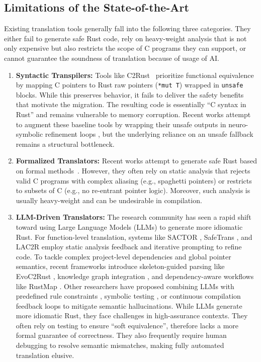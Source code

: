 \documentclass{llncs} %
\begin{document}
\subsection{Limitations of the State-of-the-Art}
%
Existing translation tools generally fall into the following three categories. They either fail to generate safe Rust code, rely on heavy-weight analysis that is not only expensive but also restricts the scope of C programs they can support, or cannot guarantee the soundness of translation because of usage of AI.
%
\begin{enumerate}
    \item \textbf{Syntactic Transpilers:} Tools like C2Rust~\cite{C2Rust} prioritize functional equivalence by mapping C pointers to Rust raw pointers (\texttt{*mut T}) wrapped in \texttt{unsafe} blocks. While this preserves behavior, it fails to deliver the safety benefits that motivate the migration. The resulting code is essentially ``C syntax in Rust'' and remains vulnerable to memory corruption. Recent works attempt to augment these baseline tools by wrapping their unsafe outputs in neuro-symbolic refinement loops \cite{nitin2025c2saferrust}, but the underlying reliance on an unsafe fallback remains a structural bottleneck.
    \item \textbf{Formalized Translators:} Recent works attempt to generate safe Rust based on formal methods~\cite{Emre2021,Fromherz2024}. However, they often rely on static analysis that rejects valid C programs with complex aliasing (e.g., spaghetti pointers) or restricts to subsets of C (e.g., no re-entrant pointer logic). Moreover, such analysis is usually heavy-weight and can be undesirable in compilation.
    \item \textbf{LLM-Driven Translators:} The research community has seen a rapid shift toward using Large Language Models (LLMs) to generate more idiomatic Rust. For function-level translation, systems like SACTOR \cite{zhou2025sactor}, SafeTrans \cite{farrukh2025safetrans}, and LAC2R \cite{sim2025lac2r} employ static analysis feedback and iterative prompting to refine code. To tackle complex project-level dependencies and global pointer semantics, recent frameworks introduce skeleton-guided parsing like EvoC2Rust \cite{wang2025evoc2rust}, knowledge graph integration \cite{yuan2025projectlevel}, and dependency-aware workflows like RustMap \cite{cai2025rustmap}. Other researchers have proposed combining LLMs with predefined rule constraints \cite{luo2025irene}, symbolic testing \cite{bai2025rustassure}, or continuous compilation feedback loops \cite{shiraishi2024smartc2rust} to mitigate semantic hallucinations. While LLMs generate more idiomatic Rust, they face challenges in high-assurance contexts. They often rely on testing to ensure ``soft equivalence'', therefore lacks a more formal guarantee of correctness. They also frequently require human debugging to resolve semantic mismatches, making fully automated translation elusive.
\end{enumerate}
\end{document}
